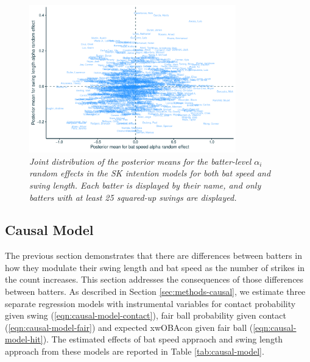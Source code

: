 \documentclass{article}
\begin{document}
      \begin{figure}[H]
        \centering
        \includegraphics[width = 0.8\textwidth]{../../figures/alpha_re.pdf}
        \caption{\it Joint distribution of the posterior means for the batter-level $\alpha_i$ random effects in the SK intention models for both bat speed and swing length. Each batter is displayed by their name, and only batters with at least 25 squared-up swings are displayed.}
        \label{fig:alpha-re}
      \end{figure}
      
    \subsection{Causal Model}
    \label{sec:results-causal}

      The previous section demonstrates that there are differences between batters in how they modulate their swing length and bat speed as the number of strikes in the count increases. This section addresses the consequences of those differences between batters. As described in Section \ref{sec:methods-causal}, we estimate three separate regression models with instrumental variables for contact probability given swing (\ref{eqn:causal-model-contact}), fair ball probability given contact (\ref{eqn:causal-model-fair}) and expected xwOBAcon given fair ball (\ref{eqn:causal-model-hit}). The estimated effects of bat speed appraoch and swing length approach from these models are reported in Table \ref{tab:causal-model}.
\end{document}
